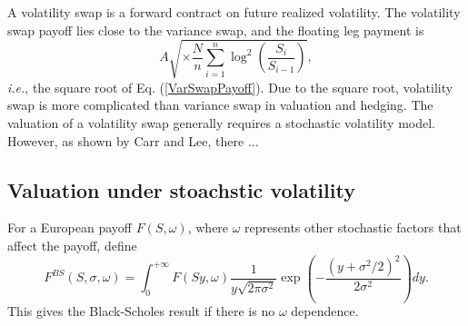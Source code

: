\documentclass[12pt]{article}
\begin{document}
  A volatility swap is a forward contract on future realized volatility.  The volatility swap payoff lies close 
  to the variance swap, and the floating leg payment is
  \begin{equation}
    A\sqrt{\times\frac{N}{n}\sum_{i=1}^{n}\log^2\left(\frac{S_i}{S_{i-1}}\right)},
  \end{equation}
  {\it i.e.}, the square root of Eq. (\ref{VarSwapPayoff}). Due to the square root, volatility swap is more complicated
  than variance swap in valuation and hedging. The valuation of a volatility swap generally requires a stochastic volatility
  model. However, as shown by Carr and Lee, there ...

  \subsection{Valuation under stoachstic volatility}
    For a European payoff $F(S,\omega)$, where $\omega$ represents other stochastic factors that affect the payoff,
    define 
    \begin{equation}
      F^{BS}\left(S, \sigma, \omega\right) = \int_0^{+\infty}F(Sy,\omega)
                          \frac{1}{y\sqrt{2\pi\sigma^2}}\exp\left(-\frac{\left(y+\sigma^2/2\right)^2}{2\sigma^2}\right)dy.
    \end{equation}
    This gives the Black-Scholes result if there is no $\omega$ dependence. 
\end{document}
